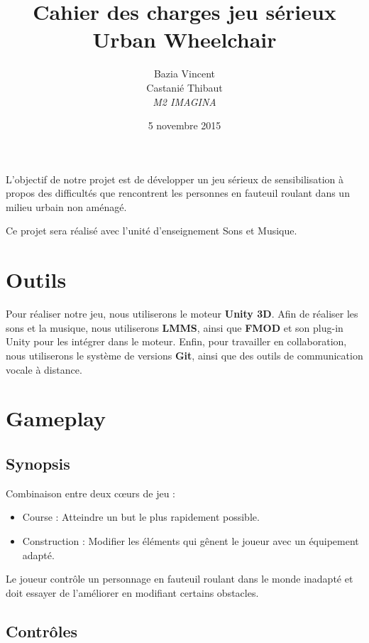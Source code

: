 \documentclass[a4paper,11pt]{article}
\begin{document}
\author{Bazia Vincent\\Castanié Thibaut\\\textit{M2 IMAGINA}}
\title{\textbf{Cahier des charges jeu sérieux}\\Urban Wheelchair}
\date{5 novembre 2015}

\maketitle

\newpage

L’objectif de notre projet est de développer un jeu sérieux de sensibilisation à propos des difficultés que rencontrent les personnes en fauteuil roulant dans un milieu urbain non aménagé. 

Ce projet sera réalisé avec l’unité d’enseignement Sons et Musique.

\section{Outils}
Pour réaliser notre jeu, nous utiliserons le moteur \textbf{Unity 3D}. Afin de réaliser les sons et la musique, nous utiliserons \textbf{LMMS}, ainsi que \textbf{FMOD} et son plug-in Unity pour les intégrer dans le moteur. Enfin, pour travailler en collaboration, nous utiliserons le système de versions \textbf{Git}, ainsi que des outils de communication vocale à distance.

\section{Gameplay}

\subsection*{Synopsis}

Combinaison entre deux cœurs de jeu :
\begin{itemize}
\item Course : Atteindre un but le plus rapidement possible.
\item Construction : Modifier les éléments qui gênent le joueur avec un équipement adapté. 
\end{itemize}

Le joueur contrôle un personnage en fauteuil roulant dans le monde inadapté et doit essayer de l’améliorer en modifiant certains obstacles.

\subsection*{Contrôles}
\end{document}
